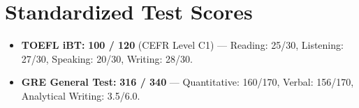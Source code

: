 \documentclass[10pt,letterpaper]{article}
\begin{document}
\vspace{-6pt}
\section{Standardized Test Scores}
\begin{itemize}[leftmargin=*,itemsep=1pt,topsep=1pt]
  \item \textbf{TOEFL iBT:} \textbf{100 / 120} (CEFR Level C1) --- Reading: 25/30, Listening: 27/30, Speaking: 20/30, Writing: 28/30.
  \item \textbf{GRE General Test:} \textbf{316 / 340} --- Quantitative: 160/170, Verbal: 156/170, Analytical Writing: 3.5/6.0.
\end{itemize}

\end{document}
